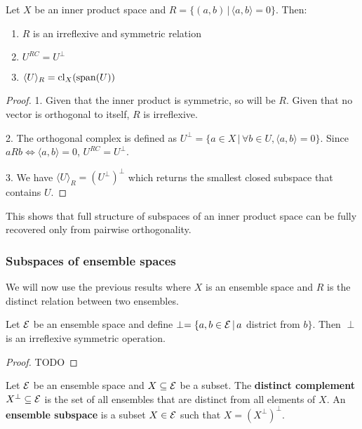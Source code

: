 \begin{prop}
	Let $X$ be an inner product space and $R = \{(a,b) \,|\, \langle a , b\rangle = 0\}$. Then:
	\begin{enumerate}
		\item $R$ is an irreflexive and symmetric relation
		\item $U^{RC} = U^{\perp}$
		\item $\langle U \rangle_R = \mathrm{cl}_X (\mathrm{span}(U))$
	\end{enumerate}
\end{prop}

\begin{proof}
	1. Given that the inner product is symmetric, so will be $R$. Given that no vector is orthogonal to itself, $R$ is irreflexive.
	
	2. The orthogonal complex is defined as $U^\perp = \{ a \in X \, | \, \forall b \in U, \langle a , b\rangle = 0 \}$. Since $aRb \iff \langle a , b\rangle = 0$, $U^{RC} = U^{\perp}$.
	
	3. We have $\langle U \rangle_R = (U^{\perp})^\perp$ which returns the smallest closed subspace that contains $U$.
\end{proof}

This shows that full structure of subspaces of an inner product space can be fully recovered only from pairwise orthogonality.

\subsubsection{Subspaces of ensemble spaces}

We will now use the previous results where $X$ is an ensemble space and $R$ is the distinct relation between two ensembles.

\begin{prop}
	Let $\mathcal{E}$ be an ensemble space and define $\perp = \{ a,b \in \mathcal{E} \, | \, a $ district from $b \}$. Then $\perp$ is an irreflexive symmetric operation.
\end{prop}

\begin{proof}
	TODO
\end{proof}

\begin{defn}
	Let $\mathcal{E}$ be an ensemble space and $X \subseteq \mathcal{E}$ be a subset. The \textbf{distinct complement} $X^\perp \subseteq \mathcal{E}$ is the set of all ensembles that are distinct from all elements of $X$. An \textbf{ensemble subspace} is a subset $X \in \mathcal{E}$ such that $X = (X^\perp)^\perp$.
\end{defn}


